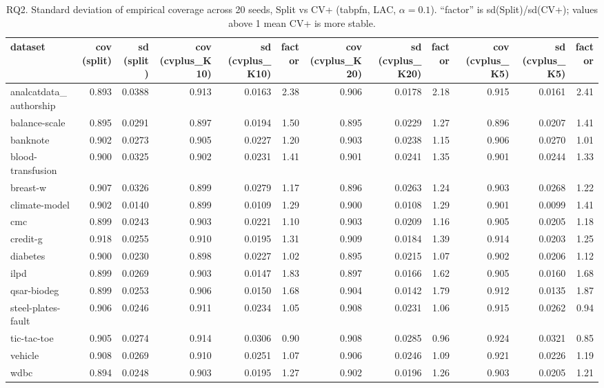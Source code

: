 \begin{table}[t]
\centering
\small
\caption{RQ2. Standard deviation of empirical coverage across 20 seeds, Split vs CV+ (tabpfn, LAC, $\alpha=0.1$). ``factor'' is sd(Split)/sd(CV+); values above 1 mean CV+ is more stable.}
\label{tab:stability}
\begin{tabular}{lrrrrrrrrrrr}
\toprule
dataset & cov (split) & sd (split) & cov (cvplus\_K10) & sd (cvplus\_K10) & factor & cov (cvplus\_K20) & sd (cvplus\_K20) & factor & cov (cvplus\_K5) & sd (cvplus\_K5) & factor \\
\midrule
analcatdata\_authorship & 0.893 & 0.0388 & 0.913 & 0.0163 & 2.38 & 0.906 & 0.0178 & 2.18 & 0.915 & 0.0161 & 2.41 \\
balance-scale & 0.895 & 0.0291 & 0.897 & 0.0194 & 1.50 & 0.895 & 0.0229 & 1.27 & 0.896 & 0.0207 & 1.41 \\
banknote & 0.902 & 0.0273 & 0.905 & 0.0227 & 1.20 & 0.903 & 0.0238 & 1.15 & 0.906 & 0.0270 & 1.01 \\
blood-transfusion & 0.900 & 0.0325 & 0.902 & 0.0231 & 1.41 & 0.901 & 0.0241 & 1.35 & 0.901 & 0.0244 & 1.33 \\
breast-w & 0.907 & 0.0326 & 0.899 & 0.0279 & 1.17 & 0.896 & 0.0263 & 1.24 & 0.903 & 0.0268 & 1.22 \\
climate-model & 0.902 & 0.0140 & 0.899 & 0.0109 & 1.29 & 0.900 & 0.0108 & 1.29 & 0.901 & 0.0099 & 1.41 \\
cmc & 0.899 & 0.0243 & 0.903 & 0.0221 & 1.10 & 0.903 & 0.0209 & 1.16 & 0.905 & 0.0205 & 1.18 \\
credit-g & 0.918 & 0.0255 & 0.910 & 0.0195 & 1.31 & 0.909 & 0.0184 & 1.39 & 0.914 & 0.0203 & 1.25 \\
diabetes & 0.900 & 0.0230 & 0.898 & 0.0227 & 1.02 & 0.895 & 0.0215 & 1.07 & 0.902 & 0.0206 & 1.12 \\
ilpd & 0.899 & 0.0269 & 0.903 & 0.0147 & 1.83 & 0.897 & 0.0166 & 1.62 & 0.905 & 0.0160 & 1.68 \\
qsar-biodeg & 0.899 & 0.0253 & 0.906 & 0.0150 & 1.68 & 0.904 & 0.0142 & 1.79 & 0.912 & 0.0135 & 1.87 \\
steel-plates-fault & 0.906 & 0.0246 & 0.911 & 0.0234 & 1.05 & 0.908 & 0.0231 & 1.06 & 0.915 & 0.0262 & 0.94 \\
tic-tac-toe & 0.905 & 0.0274 & 0.914 & 0.0306 & 0.90 & 0.908 & 0.0285 & 0.96 & 0.924 & 0.0321 & 0.85 \\
vehicle & 0.908 & 0.0269 & 0.910 & 0.0251 & 1.07 & 0.906 & 0.0246 & 1.09 & 0.921 & 0.0226 & 1.19 \\
wdbc & 0.894 & 0.0248 & 0.903 & 0.0195 & 1.27 & 0.902 & 0.0196 & 1.26 & 0.903 & 0.0205 & 1.21 \\
\bottomrule
\end{tabular}
\end{table}
